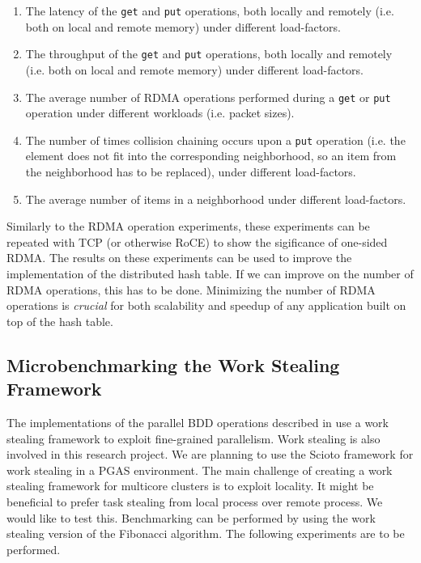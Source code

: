 \begin{enumerate}
	\item The latency of the \texttt{get} and \texttt{put} operations, both locally and remotely (i.e. both on local and remote memory) under different load-factors.
	\item The throughput of the \texttt{get} and \texttt{put} operations, both locally and remotely (i.e. both on local and remote memory) under different load-factors. 
	\item The average number of RDMA operations performed during a \texttt{get} or \texttt{put} operation under different workloads (i.e. packet sizes).
	\item The number of times collision chaining occurs upon a \texttt{put} operation (i.e. the element does not fit into the corresponding neighborhood, so an item from the neighborhood has to be replaced), under different load-factors.
	\item The average number of items in a neighborhood under different load-factors.
\end{enumerate}

Similarly to the RDMA operation experiments, these experiments can be repeated with TCP (or otherwise RoCE) to show the sigificance of one-sided RDMA. The results on these experiments can be used to improve the implementation of the distributed hash table. If we can improve on the number of RDMA operations, this has to be done. Minimizing the number of RDMA operations is \emph{crucial} for both scalability and speedup of any application built on top of the hash table. 

\subsection{Microbenchmarking the Work Stealing Framework}
The implementations of the parallel BDD operations described in \cite{sylvan_multicore_bdd, dijk2012parallelization} use a work stealing framework to exploit fine-grained parallelism. Work stealing is also involved in this research project. We are planning to use the Scioto framework \cite{dinan2008scioto} for work stealing in a PGAS environment. The main challenge of creating a work stealing framework for multicore clusters is to exploit locality. It might be beneficial to prefer task stealing from local process over remote process. We would like to test this. Benchmarking can be performed by using the work stealing version of the Fibonacci algorithm. The following experiments are to be performed.

